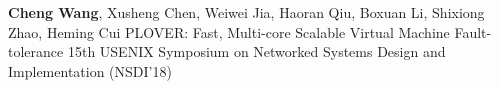 \cvpub
{\textbf{Cheng Wang}, Xusheng Chen, Weiwei Jia, Haoran Qiu, Boxuan Li, Shixiong Zhao, Heming Cui } %
{PLOVER: Fast, Multi-core Scalable Virtual Machine Fault-tolerance} %
{} %
{} %
{ %
15th USENIX Symposium on Networked Systems Design and Implementation (NSDI'18) 
}
